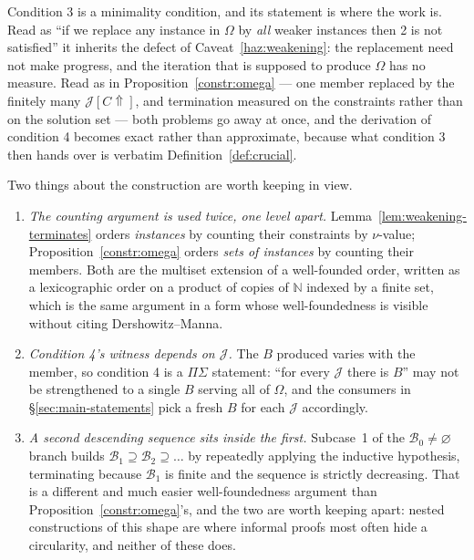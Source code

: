 \begin{hazard}\label{haz:omega}
Condition 3 is a minimality condition, and its statement is where the work is.
Read as ``if we replace any instance in $\Omega$ by \emph{all} weaker instances
then 2 is not satisfied'' it inherits the defect of
Caveat~\ref{haz:weakening}: the replacement need not make progress, and the
iteration that is supposed to produce $\Omega$ has no measure. Read as in Proposition~\ref{constr:omega} --- one member replaced by the
finitely many $\mathcal J[C\Uparrow]$, and termination measured on the
constraints rather than on the solution set --- both problems go away at once,
and the derivation of condition 4 becomes exact rather than approximate,
because what condition 3 then hands over is verbatim
Definition~\ref{def:crucial}.

Two things about the construction are worth keeping in view.

\begin{enumerate}\alphlabels\tightlist
\item \emph{The counting argument is used twice, one level apart.}
  Lemma~\ref{lem:weakening-terminates} orders \emph{instances} by counting
  their constraints by $\nu$-value; Proposition~\ref{constr:omega} orders
  \emph{sets of instances} by counting their members. Both are the multiset
  extension of a well-founded order, written as a lexicographic order on a
  product of copies of $\mathbb N$ indexed by a finite set, which is the same
  argument in a form whose well-foundedness is visible without citing
  Dershowitz--Manna.
\item \emph{Condition 4's witness depends on $\mathcal J$.} The $B$ produced
  varies with the member, so condition 4 is a $\Pi\Sigma$ statement: ``for
  every $\mathcal J$ there is $B$'' may not be strengthened to a single $B$
  serving all of $\Omega$, and the consumers in \S\ref{sec:main-statements}
  pick a fresh $B$ for each $\mathcal J$ accordingly.
\item \emph{A second descending sequence sits inside the first.} Subcase~1 of
  the $\mathcal B_{0}\neq\varnothing$ branch builds
  $\mathcal B_{1}\supseteq\mathcal B_{2}\supseteq\dots$ by repeatedly applying
  the inductive hypothesis, terminating because $\mathcal B_{1}$ is finite and
  the sequence is strictly decreasing. That is a different and much easier
  well-foundedness argument than
  Proposition~\ref{constr:omega}'s, and the two are worth keeping apart:
  nested constructions of this shape are where informal proofs most often hide
  a circularity, and neither of these does.
\end{enumerate}
\end{hazard}

